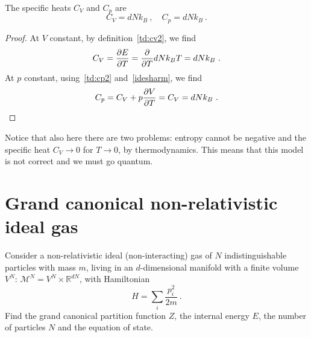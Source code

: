     The specific heats $C_V$ and $C_p$ are 
    \begin{equation*}
        C_V = d N k_B  ~, \quad C_p = d N k_B ~. 
    \end{equation*}
    \begin{proof}
        At $V$ constant, by definition~\eqref{td:cv2}, we find
        \begin{equation*}
            C_V = \frac{\partial E}{\partial T} = \frac{\partial}{\partial T} d N k_B T  = d N k_B ~.
        \end{equation*}
        At $p$ constant, using~\eqref{td:cp2} and~\eqref{idesharm}, we find
        \begin{equation*}
            C_p = C_V + p \frac{\partial V}{\partial T} = C_V = d N k_B ~.
        \end{equation*}
    \end{proof}

    Notice that also here there are two problems: entropy cannot be negative and the specific heat $C_V \rightarrow 0$ for $T \rightarrow 0$, by thermodynamics. This means that this model is not correct and we must go quantum.

\section{Grand canonical non-relativistic ideal gas}

    \begin{exercise}
        Consider a non-relativistic ideal (non-interacting) gas of $N$ indistinguishable particles with mass $m$, living in an $d$-dimensional manifold with a finite volume $V^N$: $\mathcal M^N = V^N \times \mathbb R^{dN}$, with Hamiltonian 
        \begin{equation*}
            H = \sum_i \frac{p^2_i}{2m} ~.
        \end{equation*}
        Find the grand canonical partition function $Z$, the internal energy $E$, the number of particles $N$ and the equation of state.
    \end{exercise}

